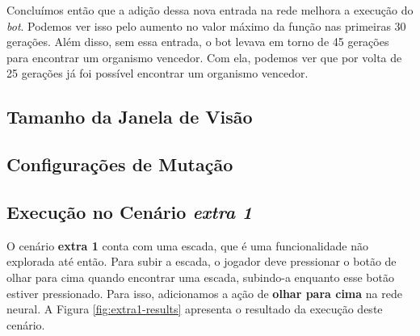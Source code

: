Concluímos então que a adição dessa nova entrada na rede melhora a execução do
\textit{bot}. Podemos ver isso pelo aumento no valor máximo da função nas
primeiras 30 gerações. Além disso, sem essa entrada, o bot levava em torno de
45 gerações para encontrar um organismo vencedor. Com ela, podemos ver que por
volta de 25 gerações já foi possível encontrar um organismo vencedor.

\subsection{\label{section:experiment-vision}Tamanho da Janela de Visão}


\subsection{Configurações de Mutação}


\subsection{Execução no Cenário \textit{extra 1}}

O cenário \textbf{extra 1} conta com uma escada, que é uma funcionalidade não
explorada até então. Para subir a escada, o jogador deve pressionar o botão de
olhar para cima quando encontrar uma escada, subindo-a enquanto esse botão
estiver pressionado. Para isso, adicionamos a ação de \textbf{olhar para cima}
na rede neural. A Figura \ref{fig:extra1-results} apresenta o resultado da
execução deste cenário.

